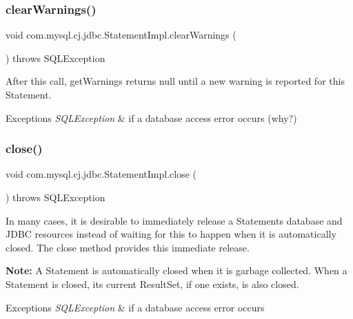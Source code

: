 \subsubsection{\texorpdfstring{clear\+Warnings()}{clearWarnings()}}
{\footnotesize\ttfamily void com.\+mysql.\+cj.\+jdbc.\+Statement\+Impl.\+clear\+Warnings (\begin{DoxyParamCaption}{ }\end{DoxyParamCaption}) throws S\+Q\+L\+Exception}

After this call, get\+Warnings returns null until a new warning is reported for this Statement.


\begin{DoxyExceptions}{Exceptions}
{\em S\+Q\+L\+Exception} & if a database access error occurs (why?) \\
\hline
\end{DoxyExceptions}
\mbox{\label{classcom_1_1mysql_1_1cj_1_1jdbc_1_1_statement_impl_ac913294cd1adc42af73229a6ba2e4f0b}} 
\subsubsection{\texorpdfstring{close()}{close()}}
{\footnotesize\ttfamily void com.\+mysql.\+cj.\+jdbc.\+Statement\+Impl.\+close (\begin{DoxyParamCaption}{ }\end{DoxyParamCaption}) throws S\+Q\+L\+Exception}

In many cases, it is desirable to immediately release a Statement\textquotesingle{}s database and J\+D\+BC resources instead of waiting for this to happen when it is automatically closed. The close method provides this immediate release.

{\bfseries Note\+:} A Statement is automatically closed when it is garbage collected. When a Statement is closed, its current Result\+Set, if one exists, is also closed. 


\begin{DoxyExceptions}{Exceptions}
{\em S\+Q\+L\+Exception} & if a database access error occurs \\
\hline
\end{DoxyExceptions}
\mbox{\label{classcom_1_1mysql_1_1cj_1_1jdbc_1_1_statement_impl_a471a61331072cf89533c58507ad21719}} 
